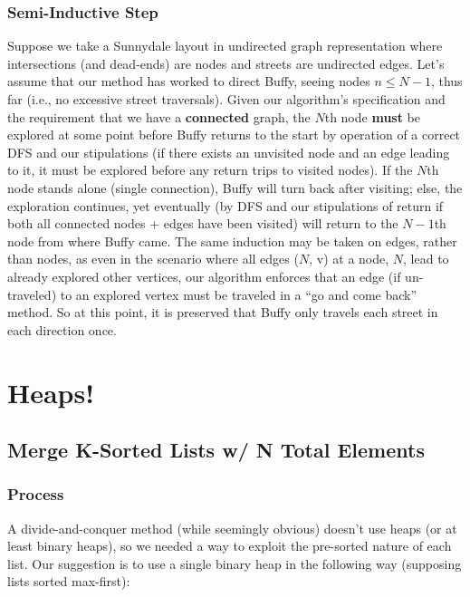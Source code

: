 \documentclass[conference]{styles/acmsiggraph}
\newcommand{\?}{\stackrel{?}{=}}
\begin{document}
\subsubsection{Semi-Inductive Step}
Suppose we take a Sunnydale layout in undirected graph representation where intersections (and dead-ends) are nodes and streets are undirected edges.  Let's assume that our method has worked to direct Buffy, seeing nodes $n \leq N-1$, thus far (i.e., no excessive street traversals).  Given our algorithm's specification and the requirement that we have a \textbf{connected} graph, the $N$th node \textbf{must} be explored at some point before Buffy returns to the start by operation of a correct DFS and our stipulations (if there exists an unvisited node and an edge leading to it, it must be explored before any return trips to visited nodes).  If the $N$th node stands alone (single connection), Buffy will turn back after visiting; else, the exploration continues, yet eventually (by DFS and our stipulations of return if both all connected nodes + edges have been visited) will return to the $N-1$th node from where Buffy came.  The same induction may be taken on edges, rather than nodes, as even in the scenario where all edges ($N$, v) at a node, $N$, lead to already explored other vertices, our algorithm enforces that an edge (if un-traveled) to an explored vertex must be traveled in a \enquote{go and come back} method.  So at this point, it is preserved that Buffy only travels each street in each direction once.





\newpage
\section{Heaps!}
\subsection{Merge K-Sorted Lists w/ N Total Elements}
\subsubsection{Process}
A divide-and-conquer method (while seemingly obvious) doesn't use heaps (or at least binary heaps), so we needed a way to exploit the pre-sorted nature of each list.  Our suggestion is to use a single binary heap in the following way (supposing lists sorted max-first):
\end{document}
